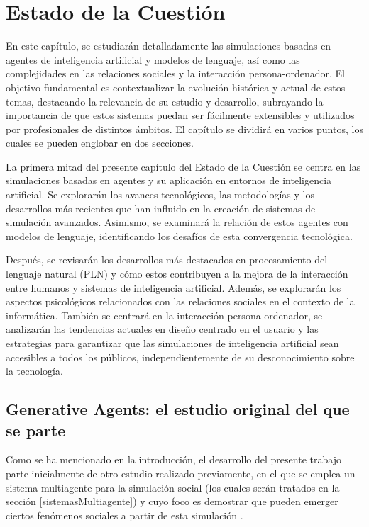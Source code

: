 \chapter{Estado de la Cuestión}
\label{cap:estadoDeLaCuestion}

En este capítulo, se estudiarán detalladamente las simulaciones basadas en agentes de inteligencia artificial y modelos de lenguaje, así como las complejidades en las relaciones sociales y la interacción persona-ordenador. El objetivo fundamental es contextualizar la evolución histórica y actual de estos temas, destacando la relevancia de su estudio y desarrollo, subrayando la importancia de que estos sistemas puedan ser fácilmente extensibles y utilizados por profesionales de distintos ámbitos. El capítulo se dividirá en varios puntos, los cuales se pueden englobar en dos secciones.

La primera mitad del presente capítulo del Estado de la Cuestión se centra en las simulaciones basadas en agentes y su aplicación en entornos de inteligencia artificial. Se explorarán los avances tecnológicos, las metodologías y los desarrollos más recientes que han influido en la creación de sistemas de simulación avanzados. Asimismo, se examinará la relación de estos agentes con modelos de lenguaje, identificando los desafíos de esta convergencia tecnológica.

Después, se revisarán los desarrollos más destacados en procesamiento del lenguaje natural (PLN) y cómo estos contribuyen a la mejora de la interacción entre humanos y sistemas de inteligencia artificial. Además, se explorarán los aspectos psicológicos relacionados con las relaciones sociales en el contexto de la informática. También se centrará en la interacción persona-ordenador, se analizarán las tendencias actuales en diseño centrado en el usuario y las estrategias para garantizar que las simulaciones de inteligencia artificial sean accesibles a todos los públicos, independientemente de su desconocimiento sobre la tecnología.

\section{Generative Agents: el estudio original del que se parte}
Como se ha mencionado en la introducción, el desarrollo del presente trabajo parte inicialmente de otro estudio realizado previamente, en el que se emplea un sistema multiagente para la simulación social (los cuales serán tratados en la sección \ref{sistemasMultiagente}) y cuyo foco es demostrar que pueden emerger ciertos fenómenos sociales a partir de esta simulación \citep{park2023generative}.

